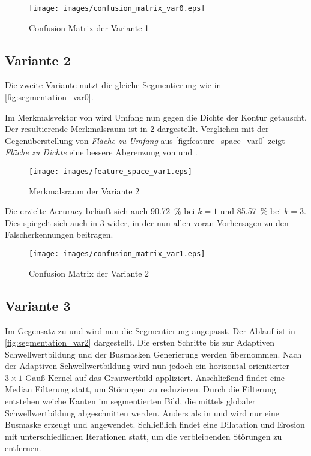 \begin{figure}[ht]
    \centering
    \texttt{[image: images/confusion\_matrix\_var0.eps]}
    \caption{\foreignlanguage{english}{Confusion Matrix} der Variante 1\label{fig:confusion_matrix_var0}}
\end{figure}

\FloatBarrier{}

\subsection{Variante 2\label{sct:variant1}}

Die zweite Variante nutzt die gleiche Segmentierung wie in \cref{fig:segmentation_var0}.

Im Merkmalsvektor von  wird Umfang nun gegen die Dichte der Kontur getauscht. Der resultierende Merkmalsraum ist in \cref{fig:feature_space_var1} dargestellt. Verglichen mit der Gegenüberstellung von \emph{Fläche zu Umfang} aus \cref{fig:feature_space_var0} zeigt \emph{Fläche zu Dichte} eine bessere Abgrenzung von  und .

\begin{figure}[ht]
    \centering
    \texttt{[image: images/feature\_space\_var1.eps]}
    \caption{Merkmalsraum der Variante 2\label{fig:feature_space_var1}}
\end{figure}

Die erzielte \foreignlanguage{english}{Accuracy} beläuft sich auch \SI{90.72}{\percent} bei \(k = 1\) und \SI{85.57}{\percent} bei \(k = 3\). Dies spiegelt sich auch in \cref{fig:confusion_matrix_var1} wider, in der nun allen voran  Vorhersagen zu den Falscherkennungen beitragen.

\begin{figure}[ht]
    \centering
    \texttt{[image: images/confusion\_matrix\_var1.eps]}
    \caption{\foreignlanguage{english}{Confusion Matrix} der Variante 2\label{fig:confusion_matrix_var1}}
\end{figure}

\FloatBarrier{}

\subsection{Variante 3\label{sct:variant2}}

Im Gegensatz zu  und  wird nun die Segmentierung angepasst. Der Ablauf ist in \cref{fig:segmentation_var2} dargestellt. Die ersten Schritte bis zur Adaptiven Schwellwertbildung und der Busmasken Generierung werden übernommen. Nach der Adaptiven Schwellwertbildung wird nun jedoch ein horizontal orientierter \(3 \times 1\) Gauß-Kernel auf das Grauwertbild appliziert. Anschließend findet eine Median Filterung statt, um Störungen zu reduzieren. Durch die Filterung entstehen weiche Kanten im segmentierten Bild, die mittels globaler Schwellwertbildung abgeschnitten werden. Anders als in  und  wird nur eine Busmaske erzeugt und angewendet. Schließlich findet eine Dilatation und Erosion mit unterschiedlichen Iterationen statt, um die verbleibenden Störungen zu entfernen.

